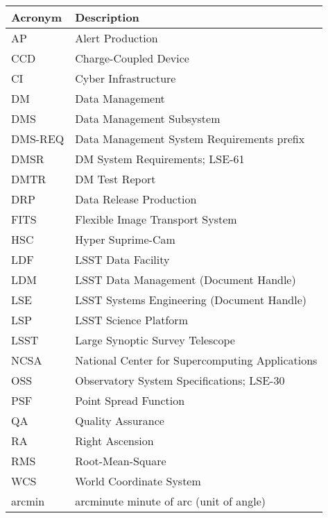 \addtocounter{table}{-1}
\begin{longtable}{p{}p{}}\hline
\textbf{Acronym} & \textbf{Description}  \\\hline

AP & Alert Production \\\hline
CCD & Charge-Coupled Device \\\hline
CI & Cyber Infrastructure \\\hline
DM & Data Management \\\hline
DMS & Data Management Subsystem \\\hline
DMS-REQ & Data Management System Requirements prefix \\\hline
DMSR & DM System Requirements; LSE-61 \\\hline
DMTR & DM Test Report \\\hline
DRP & Data Release Production \\\hline
FITS & Flexible Image Transport System \\\hline
HSC & Hyper Suprime-Cam \\\hline
LDF & LSST Data Facility \\\hline
LDM & LSST Data Management (Document Handle) \\\hline
LSE & LSST Systems Engineering (Document Handle) \\\hline
LSP & LSST Science Platform \\\hline
LSST & Large Synoptic Survey Telescope \\\hline
NCSA & National Center for Supercomputing Applications \\\hline
OSS & Observatory System Specifications; LSE-30 \\\hline
PSF & Point Spread Function \\\hline
QA & Quality Assurance \\\hline
RA & Right Ascension \\\hline
RMS & Root-Mean-Square \\\hline
WCS & World Coordinate System \\\hline
arcmin & arcminute minute of arc (unit of angle) \\\hline
\end{longtable}
